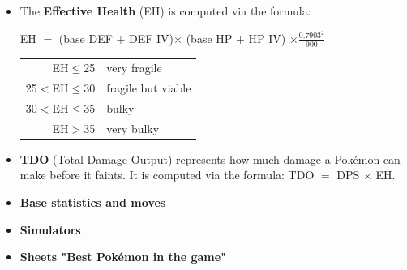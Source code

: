 \documentclass[12pt]{beamer}
\begin{document}
\begin{frame}
\begin{block}{}
\begin{footnotesize}
\begin{itemize}
  \item The \textbf{Effective Health} (EH) is computed via the formula:
\begin{center}
EH $=$ (base DEF + DEF IV)$\times$ (base HP + HP IV) $\times \frac{0.7903^2}{900}$
\end{center}
\begin{center}
\begin{tabular}{rl}
EH$\leq$25   &  very fragile  \\
25$<$EH$\leq$30   &  fragile but viable  \\
30$<$EH$\leq$35   &  bulky  \\
EH$>$35   &  very bulky  \\
\end{tabular}
\end{center}
\item \textbf{TDO} (Total Damage Output) represents how much damage a Pok\'emon can make before it faints. It is computed via the formula: 
TDO $=$ DPS $\times$ EH.
\item \textbf{Base statistics and moves}

\begin{center}
   \href{https://pokemongo.gamepress.gg/}{} \quad \quad 
   \href{https://pokegocomplete.com}{}
\end{center}

\item \textbf{Simulators}
   
\begin{center}
   \href{https://pokemongo.gamepress.gg/comprehensive-dps-spreadsheet}{}  \quad \quad 
   \href{https://www.pokebattler.com}{} 
\end{center}

\item \textbf{Sheets  "Best Pokémon in the game"}
\begin{center}
   \href{https://imgur.com/a/1nSSUqM}{}
   \end{center}
\end{itemize}

\end{footnotesize}
\end{block}
\end{frame}


\renewcommand{\baselinestretch}{1.0}
\end{document}
